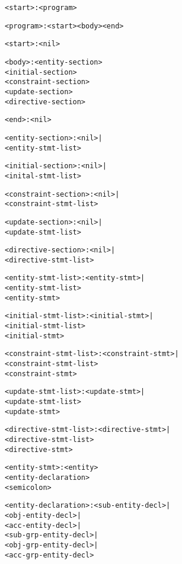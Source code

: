 \documentclass[11pt]{report}
\newenvironment{vverbatim}
{
  \begin{alltt}
}
{
    \vspace{-\baselineskip}
  \end{alltt}
}
\begin{document}
      \begin{vverbatim}
<start>                  : <program>

<program>                : <start> <body> <end>

<start>                  : <nil>

<body>                   : <entity-section>
                           <initial-section>
                           <constraint-section>
                           <update-section>
                           <directive-section>

<end>                    : <nil>

<entity-section>         : <nil> |
                           <entity-stmt-list>

<initial-section>        : <nil> |
                           <inital-stmt-list>

<constraint-section>     : <nil> |
                           <constraint-stmt-list>

<update-section>         : <nil> |
                           <update-stmt-list>

<directive-section>      : <nil> |
                           <directive-stmt-list>

<entity-stmt-list>       : <entity-stmt> |
                           <entity-stmt-list>
                           <entity-stmt>

<initial-stmt-list>      : <initial-stmt> |
                           <initial-stmt-list>
                           <initial-stmt>

<constraint-stmt-list>   : <constraint-stmt> |
                           <constraint-stmt-list>
                           <constraint-stmt>

<update-stmt-list>       : <update-stmt> |
                           <update-stmt-list>
                           <update-stmt>

<directive-stmt-list>    : <directive-stmt> |
                           <directive-stmt-list>
                           <directive-stmt>

<entity-stmt>            : <entity>
                           <entity-declaration>
                           <semicolon>

<entity-declaration>     : <sub-entity-decl> |
                           <obj-entity-decl> |
                           <acc-entity-decl> |
                           <sub-grp-entity-decl> |
                           <obj-grp-entity-decl> |
                           <acc-grp-entity-decl>


\end{vverbatim}
\end{document}

